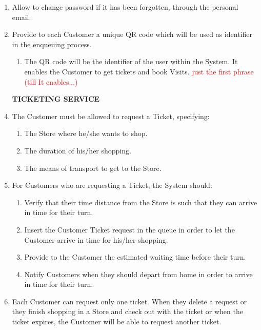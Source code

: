 \documentclass[a4paper, 10pt, oneside]{article}
\newcommand*{\lorenzo}[1]{\textcolor{BurntOrange}{#1}}
\newcommand{\yasmin}[1]{\textcolor{Red}{#1}}
\begin{document}
\begin{enumerate}[align=left]
    \item \label{req:changePassWithMail}Allow to change password if it has been forgotten, through the personal email.
    \item \label{req:provideQR} Provide to each Customer a unique QR code \lorenzo{which will be used as identifier in the enqueuing process}.
    \begin{enumerate}[label={-}]
        \item \label{req:provideQR:uniqueID} \lorenzo{The QR code will be the identifier of the user within the System. It enables the Customer to get tickets and book Visits.} \yasmin{just the first phrase (till It enables...)}
    \end{enumerate}
    
    \item[\textbf{TICKETING SERVICE}]
    \item \label{req:requestTicket} The Customer must be allowed to request a Ticket, specifying:
     \begin{enumerate}[label={-}]
        \item \label{req:requestTicket:store} The Store where he/she wants to shop.
        \item \label{req:requestTicket:duration}The duration of his/her shopping.
        \item \label{req:requestTicket:transport}The means of transport to get to the Store.
    \end{enumerate}
    \item \label{req:systemTicket}For Customers who are requesting a Ticket, the System should:
    \begin{enumerate}[label={-}]
        \item \label{req:systemTicket:verifyDist} Verify that their time distance from the Store is such that they can arrive in time for their turn.
        \item \label{req:systemTicket:addInQueue}Insert the Customer Ticket request in the queue in order to let the Customer arrive in time for his/her shopping.
        \item \label{req:systemTicket:waitingTime} Provide to the Customer the estimated waiting time before their turn.
        \item \label{req:systemTicket:notifForDepart} Notify Customers when they should depart from home in order to arrive in time for their turn.
    \end{enumerate}
    \item \label{req:numberTicketPerCust} Each Customer can request only one ticket. When they delete a request or they finish shopping in a Store and check out with the ticket or when the ticket expires, the Customer will be able to request another ticket.
    

\end{enumerate}
\end{document}
